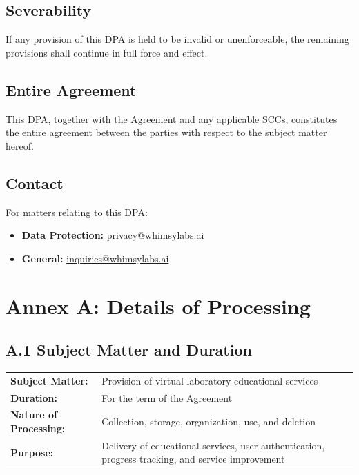 \documentclass[11pt,a4paper]{article}
\begin{document}
\subsection{Severability}
If any provision of this DPA is held to be invalid or unenforceable, the remaining provisions shall continue in full force and effect.

\subsection{Entire Agreement}
This DPA, together with the Agreement and any applicable SCCs, constitutes the entire agreement between the parties with respect to the subject matter hereof.

\subsection{Contact}
For matters relating to this DPA:
\begin{itemize}[leftmargin=2cm]
    \item[] \textbf{Data Protection:} \href{mailto:privacy@whimsylabs.ai}{privacy@whimsylabs.ai}
    \item[] \textbf{General:} \href{mailto:inquiries@whimsylabs.ai}{inquiries@whimsylabs.ai}
\end{itemize}

\newpage
\appendix
\section*{Annex A: Details of Processing}

\subsection*{A.1 Subject Matter and Duration}

\begin{tabular}{@{}>{\bfseries}p{4cm}p{10cm}@{}}
Subject Matter: & Provision of virtual laboratory educational services \\
Duration: & For the term of the Agreement \\
Nature of Processing: & Collection, storage, organization, use, and deletion \\
Purpose: & Delivery of educational services, user authentication, progress tracking, and service improvement \\
\end{tabular}
\end{document}
